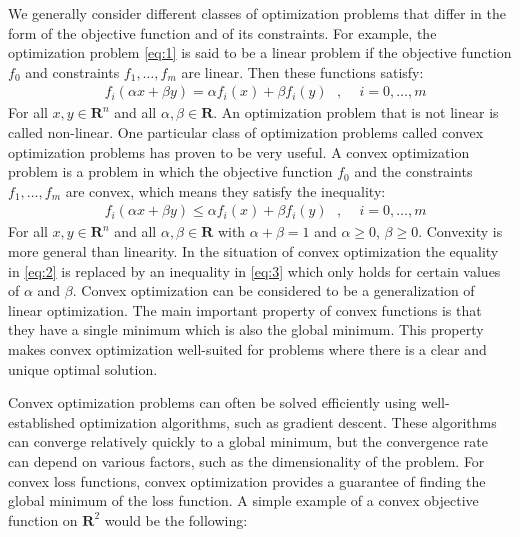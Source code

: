 We generally consider different classes of optimization problems that differ in the form of the objective function and of its constraints. For example, the optimization problem \ref{eq:1} is said to be a linear problem if the objective function $f_{0}$ and constraints $f_{1},\ldots,f_{m}$ are linear. Then these functions satisfy:
\begin{equation*}\label{eq:2}\tag{1.2}
\begin{aligned}
    &f_{i}(\alpha x + \beta y) = \alpha f_{i}(x) + \beta f_{i}(y) \text{ } \text{,}\text{     }\text{  }i=0,\ldots,m
\end{aligned}
\end{equation*}
For all $x,y \in \mathbf{R}^{n}$ and all $\alpha,\beta \in \mathbf{R}$. An optimization problem that is not linear is called non-linear. One particular class of optimization problems called convex optimization problems has proven to be very useful. A convex optimization problem is a problem in which the objective function $f_{0}$ and the constraints $f_{1},\ldots,f_{m}$ are convex, which means they satisfy the inequality:
\begin{equation*}\label{eq:3}\tag{1.3}
\begin{aligned}
    &f_{i}(\alpha x + \beta y) \leq \alpha f_{i}(x) + \beta f_{i}(y) \text{ } \text{,}\text{    }\text{  }i=0,\ldots,m
\end{aligned}
\end{equation*}
For all $x,y \in \mathbf{R}^{n}$ and all $\alpha,\beta \in \mathbf{R}$ with $\alpha + \beta = 1$ and $\alpha \geq 0$, $\beta \geq 0$. Convexity is more general than linearity. In the situation of convex optimization the equality in \ref{eq:2} is replaced by an inequality in \ref{eq:3} which only holds for certain values of $\alpha$ and $\beta$. Convex optimization can be considered to be a generalization of linear optimization. The main important property of convex functions is that they have a single minimum which is also the global minimum. This property makes convex optimization well-suited for problems where there is a clear and unique optimal solution. 

Convex optimization problems can often be solved efficiently using well-established optimization algorithms, such as gradient descent. These algorithms can converge relatively quickly to a global minimum, but the convergence rate can depend on various factors, such as the dimensionality of the problem. For convex loss functions, convex optimization provides a guarantee of finding the global minimum of the loss function. A simple example of a convex objective function on $\mathbf{R}^2$ would be the following: 
